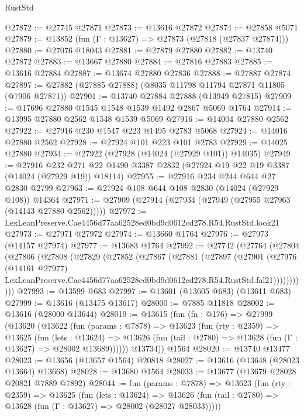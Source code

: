\begin{lexlean}{RustStd}
\begin{coremodule}
@27872 := @27745 @27871
@27873 := @13616 @27872
@27874 := @27858 @5071
@27879 := @13852 (fun (Γ : @13627) => @27873 (@27818 (@27837 @27874)))
@27880 := @27076 @18043
@27881 := @27879 @27880
@27882 := @13740 @27872
@27883 := @13667 @27880
@27884 := @27816 @27883
@27885 := @13616 @27884
@27887 := @13674 @27880 @27836
@27888 := @27887 @27874
@27897 := @27882 (@27885 @27888) (@8035 @11798 @11794 @27871 @11805 (@7906 @27871))
@27901 := @13740 @27884 @27888 (@13949 @27815)
@27909 := @17696 @27880 @1545 @1548 @1539 @1492 @2867 @5069 @1764
@27914 := @13995 @27880 @2562 @1548 @1539 @5069
@27916 := @14004 @27880 @2562
@27922 := @27916 @230 @1547 @223 @1495 @2783 @5068
@27924 := @14016 @27880 @2562
@27928 := @27924 @101 @223 @101 @2783
@27929 := @14025 @27880
@27934 := @27922 (@27928 (@14024 (@27929 @101)) @14035)
@27949 := @27916
    @232
    @271
    @22
    @1490
    @3387
    @2832
    (@27924 @19 @22 @19 @3387 (@14024 (@27929 @19)) @18114)
@27955 := @27916 @234 @244 @644 @27 @2830 @2799
@27963 := @27924 @108 @644 @108 @2830 (@14024 (@27929 @108)) @14364
@27971 := @27909 (@27914 (@27934 (@27949 (@27955 @27963 (@14143 @27880 @2562)))))
@27972 := LexLeanPreserve.Cae4456d77aa62528ed0bd9d0612cd278.R54.RustStd.look21
@27973 := @27971 @27972
@27974 := @13660 @1764
@27976 := @27973 (@14157 @27974)
@27977 := @13683 @1764
@27992 := @27742
    (@27764
      (@27804
        (@27806
          (@27808
            (@27829
              (@27852
                (@27867
                  (@27881
                    (@27897
                      (@27901
                        (@27976
                          (@14161 @27977)
                          LexLeanPreserve.Cae4456d77aa62528ed0bd9d0612cd278.R54.RustStd.fal21)))))))))))
@27993 := @13599 @683
@27997 := @13601 (@13605 @683) (@13611 @683)
@27999 := @13616 (@13475 @13617)
@28000 := @7885 @11818
@28002 := @13616 (@28000 @13644)
@28019 := @13615
    (fun (fn : @176) =>
    @27999
      (@13620
        (@13622
          (fun (params : @7878) =>
          @13623
            (fun (rty : @2359) =>
            @13625
              (fun (lets : @13624) =>
              @13626 (fun (tail : @2780) => @13628 (fun (Γ : @13627) => @28002 @13689))))))
        @13734))
    @1564
@28020 := @13740 @13477
@28023 := @13656 (@13657 @1564) @20818
@28027 := @13616 (@13648 (@28023 @13664) @13668)
@28028 := @13680 @1564
@28033 := @13677 (@13679 @28028 @20821 @7889 @7892)
@28044 := fun (params : @7878) =>
  @13623
    (fun (rty : @2359) =>
    @13625
      (fun (lets : @13624) =>
      @13626 (fun (tail : @2780) => @13628 (fun (Γ : @13627) => @28002 (@28027 @28033)))))

\end{coremodule}
\end{lexlean}
